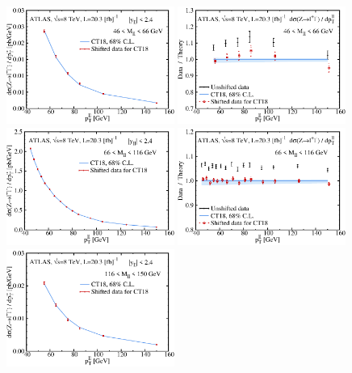 \begin{figure}[t]
\includegraphics[width=0.49\textwidth]{./fig/data_253_CT18__1_abs_ect.pdf}
\includegraphics[width=0.49\textwidth]{./fig/data_253_CT18__1_DoT_ect.pdf}
\includegraphics[width=0.49\textwidth]{./fig/data_253_CT18__2_abs_ect.pdf}
\includegraphics[width=0.49\textwidth]{./fig/data_253_CT18__2_DoT_ect.pdf}
\includegraphics[width=0.49\textwidth]{./fig/data_253_CT18__3_abs_ect.pdf}

\end{figure}
